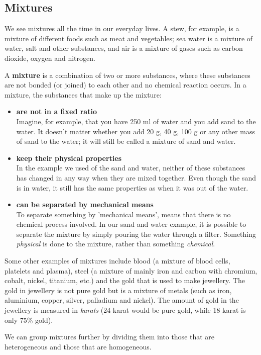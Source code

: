             \subsection{ Mixtures}
            \nopagebreak
            \label{m38708*id62584}We see mixtures all the time in our everyday lives. A stew, for example, is a mixture of different foods such as meat and vegetables; sea water is a mixture of water, salt and other substances, and air is a mixture of gases such as carbon dioxide, oxygen and nitrogen.\par 
\label{m38708*fhsst!!!underscore!!!id69}
 {\label{m38708*meaningfhsst!!!underscore!!!id69}
      A \textbf{mixture} is a combination of two or more substances, where these substances are not bonded (or joined) to each other and no chemical reaction occurs. 
       } 
      \label{m38708*id62612}In a mixture, the substances that make up the mixture:\par 
      \label{m38708*id62615}\begin{itemize}[noitemsep]
            \label{m38708*uid2}\item \textbf{are not in a fixed ratio} \\
Imagine, for example, that you have 250 ml of water and you add sand to the water. It doesn't matter whether you add 20 g, 40 g, 100 g or any other mass of sand to the water; it will still be called a mixture of sand and water.
\label{m38708*uid3}\item \textbf{keep their physical properties} \\
In the example we used of the sand and water, neither of these substances has changed in any way when they are mixed together. Even though the sand is in water, it still has the same properties as when it was out of the water.
\label{m38708*uid4}\item \textbf{can be separated by mechanical means} \\
To separate something by 'mechanical means', means that there is no chemical process involved. In our sand and water example, it is possible to separate the mixture by simply pouring the water through a filter. Something \textsl{physical} is done to the mixture, rather than something \textsl{chemical}.
\end{itemize}
      \label{m38708*id62689}Some other examples of mixtures include blood (a mixture of blood cells, platelets and plasma), steel (a mixture of mainly iron and carbon with chromium, cobalt, nickel, titanium, etc.) and the gold that is used to make jewellery. The gold in jewellery is not pure gold but is a mixture of metals (such as iron, aluminium, copper, silver, palladium and nickel). The amount of gold in the jewellery is measured in \textsl{karats} (24 karat would be pure gold, while 18 karat is only 75\% gold).\par 
      \label{m38708*id62700}We can group mixtures further by dividing them into those that are heterogeneous and those that are homogeneous.\par 

